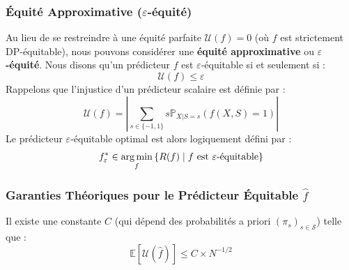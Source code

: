 \subsubsection{Équité Approximative ($\varepsilon$-équité)}

Au lieu de se restreindre à une équité parfaite $\mathcal{U}(f) = 0$ (où $f$ est strictement DP-équitable), nous pouvons considérer une \textbf{équité approximative} ou \textbf{$\varepsilon$-équité}.
Nous disons qu'un prédicteur $f$ est $\varepsilon$-équitable si et seulement si :
\begin{equation}
    \mathcal{U}(f) \le \varepsilon
\end{equation}
Rappelons que l'injustice d'un prédicteur scalaire est définie par :
\begin{equation}
    \mathcal{U}(f) = \left| \sum_{s \in \{-1, 1\}} s \mathbb{P}_{X|S=s}(f(X, S) = 1) \right|
\end{equation}
Le prédicteur $\varepsilon$-équitable optimal est alors logiquement défini par :
\begin{equation}
    f_\varepsilon^* \in \operatorname*{arg\,min}_{f} \left\{ R(f) \;\middle|\; f \text{ est } \varepsilon\text{-équitable} \right\}
\end{equation}

\subsubsection{Garanties Théoriques pour le Prédicteur Équitable $\hat{f}$}

\begin{theoreme}[Injustice]
    Il existe une constante $C$ (qui dépend des probabilités a priori $(\pi_s)_{s \in \mathcal{S}}$) telle que :
    \begin{equation}
        \mathbb{E}[\mathcal{U}(\hat{f})] \le C \times N^{-1/2}
    \end{equation}
\end{theoreme}

